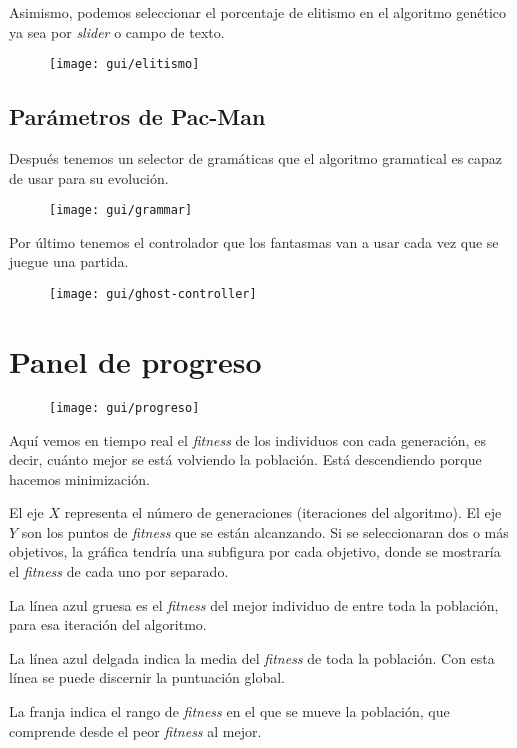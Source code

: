Asimismo, podemos seleccionar el porcentaje de elitismo en el algoritmo genético ya sea por \textit{slider} o campo de texto.
\begin{figure}[H]
\centering
\texttt{[image: gui/elitismo]}
\end{figure}

\subsection{Parámetros de Pac-Man}
Después tenemos un selector de gramáticas que el algoritmo gramatical es capaz de usar para su evolución.
\begin{figure}[H]
\centering
\texttt{[image: gui/grammar]}
\end{figure}

Por último tenemos el controlador que los fantasmas van a usar cada vez que se juegue una partida.
\begin{figure}[H]
\centering
\texttt{[image: gui/ghost-controller]}
\end{figure}

\section{Panel de progreso}
\begin{figure}[H]
\centering
\texttt{[image: gui/progreso]}
\end{figure}

Aquí vemos en tiempo real el \textit{fitness} de los individuos con cada generación, es decir, cuánto mejor se está volviendo la población. Está descendiendo porque hacemos minimización.

El eje $X$ representa el número de generaciones (iteraciones del algoritmo). El eje $Y$ son los puntos de \textit{fitness} que se están alcanzando. Si se seleccionaran dos o más objetivos, la gráfica tendría una subfigura por cada objetivo, donde se mostraría el \textit{fitness} de cada uno por separado.

La línea azul gruesa es el \textit{fitness} del mejor individuo de entre toda la población, para esa iteración del algoritmo.

La línea azul delgada indica la media del \textit{fitness} de toda la población. Con esta línea se puede discernir la puntuación global.

La franja indica el rango de \textit{fitness} en el que se mueve la población, que comprende desde el peor \textit{fitness} al mejor.

